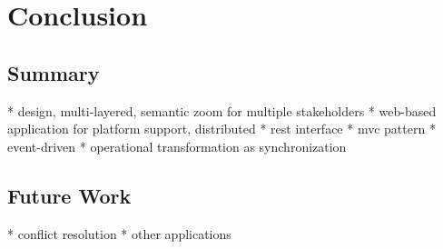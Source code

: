 \chapter{Conclusion}
\section{Summary}
* design, multi-layered, semantic zoom for multiple stakeholders
* web-based application for platform support, distributed
* rest interface
* mvc pattern
* event-driven
* operational transformation as synchronization

\section{Future Work}
* conflict resolution 
* other applications
